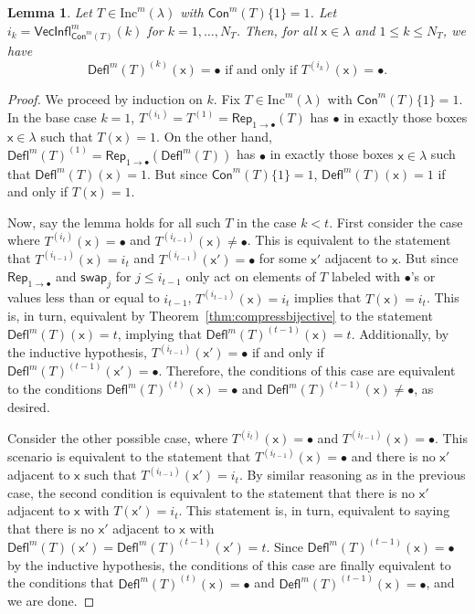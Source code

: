 \documentclass[12pt]{amsart}
\newcommand{\x}{\ensuremath{\mathsf{x}}}
\newtheorem{lemma}[theorem]{Lemma}
\theoremstyle{definition}
\theoremstyle{remark}
\numberwithin{equation}{section}
\newcommand{\inc}{\ensuremath{\mathrm{Inc}}}
\newcommand{\swap}{\ensuremath{\mathsf{swap}}}
\newcommand{\rep}{\ensuremath{\mathsf{Rep}}}
\newcommand{\deflate}{\ensuremath{\mathsf{Defl}}}
\newcommand{\inflate}{\ensuremath{\mathsf{VecInfl}}}
\newcommand{\content}{\ensuremath{\mathsf{Con}}}
\begin{document}
\begin{lemma} \label{lem:bullet_placement}
Let $T \in \inc^m(\lambda)$ with $\content^m(T) \lbrace 1 \rbrace = 1$. Let $i_k = \inflate^m_{\content^m(T)}(k)$ for $k = 1, \ldots, N_T$. Then, for all $\x \in \lambda$ and $1 \leq k \leq N_T$, we have
 \begin{equation}\label{eq:gappy_promotion2}
\deflate^m(T)^{(k)}(\x) = \bullet \text{ if and only if } T^{(i_k)}(\x) = \bullet.
\end{equation}
\end{lemma}
\begin{proof} We proceed by induction on $k$. Fix $T \in \inc^m(\lambda)$  with $\content^m(T) \lbrace 1 \rbrace = 1$. In the base case $k = 1$,  $T^{(i_1)} = T^{(1)} = \rep_{1 \rightarrow \bullet}(T)$ has $\bullet$ in exactly those boxes $\x \in \lambda$ such that $T(\x) = 1$. On the other hand, $\deflate^m(T)^{(1)} =  \rep_{1 \rightarrow \bullet}(\deflate^m(T))$ has $\bullet$ in exactly those boxes $\x \in \lambda$ such that $\deflate^m(T)(\x) = 1$. But since $\content^m(T) \lbrace 1 \rbrace = 1$, $\deflate^m(T)(\x) = 1$ if and only if $T(\x) = 1$. 


Now, say the lemma holds for all such $T$ in the case $k < t$. First consider the case where $T^{(i_t)}(\x) = \bullet$ and $T^{(i_{t-1})}(\x) \neq \bullet$. This is equivalent to the statement that $T^{(i_{t-1})}(\x) = i_t$ and $T^{(i_{t-1})}(\x') = \bullet$ for some $\x'$ adjacent to $\x$. But since $\rep_{1 \rightarrow \bullet}$ and $\swap_j$ for  $j \leq i_{t-1}$ only act on elements of $T$ labeled with $\bullet$'s or values less than or equal to $i_{t-1}$, $T^{(i_{t-1})}(\x) = i_t$ implies that $T(\x) = i_t$. This is, in turn, equivalent by Theorem~\ref{thm:compressbijective} to the statement $\deflate^m(T)(\x) = t$, implying that $\deflate^m(T)^{(t-1)}(\x) = t$. Additionally, by the inductive hypothesis, $T^{(i_{t-1})}(\x') = \bullet$ if and only if $\deflate^m(T)^{(t-1)}(\x') = \bullet$. Therefore, the conditions of this case are equivalent to the conditions $\deflate^m(T)^{(t)}(\x) = \bullet$ and $\deflate^m(T)^{(t-1)}(\x) \neq \bullet$, as desired. 

Consider the other possible case, where $T^{(i_t)}(\x) = \bullet$ and $T^{(i_{t-1})}(\x) = \bullet$. This scenario is equivalent to the statement that $T^{(i_{t-1})}(\x) = \bullet$ and there is no $\x'$ adjacent to $\x$ such that $T^{(i_{t-1})}(\x') = i_t$. By similar reasoning as in the previous case, the second condition is equivalent to the statement that there is no $\x'$ adjacent to $\x$ with $T(\x') = i_t$. This statement is, in turn, equivalent to saying that there is no $\x'$ adjacent to $\x$ with $\deflate^m(T)(\x') = \deflate^m(T)^{(t-1)}(\x') = t$. Since $\deflate^m(T)^{(t-1)}(\x) = \bullet$ by the inductive hypothesis, the conditions of this case are finally equivalent to the conditions that $\deflate^m(T)^{(t)}(\x) = \bullet$ and $\deflate^m(T)^{(t-1)}(\x) = \bullet$, and we are done.
\end{proof}
\end{document}

